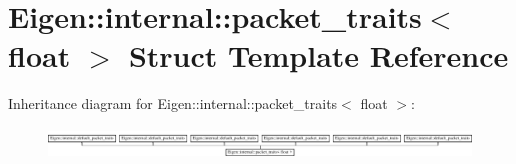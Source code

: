 \hypertarget{struct_eigen_1_1internal_1_1packet__traits_3_01float_01_4}{}\section{Eigen\+::internal\+::packet\+\_\+traits$<$ float $>$ Struct Template Reference}
\label{struct_eigen_1_1internal_1_1packet__traits_3_01float_01_4}
Inheritance diagram for Eigen\+::internal\+::packet\+\_\+traits$<$ float $>$\+:\begin{figure}[H]
\begin{center}
\leavevmode
\includegraphics[height=0.829630cm]{struct_eigen_1_1internal_1_1packet__traits_3_01float_01_4}
\end{center}
\end{figure}
